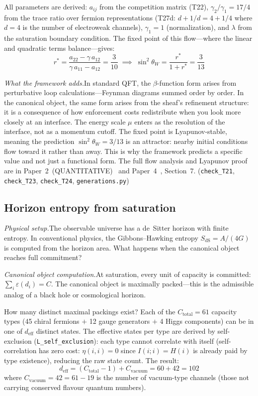 \documentclass[11pt]{article}
\begin{document}
All parameters are derived: $a_{ij}$ from the competition matrix (T22), $\gamma_2/\gamma_1 = 17/4$ from the trace ratio over fermion representations (T27d: $d + 1/d = 4 + 1/4$ where $d=4$ is the number of electroweak channels), $\gamma_1 = 1$ (normalization), and $\lambda$ from the saturation boundary condition.  The fixed point of this flow---where the linear and quadratic terms balance---gives:
\begin{equation}
r^* = \frac{a_{22} - \gamma\, a_{12}}{\gamma\, a_{11} - a_{12}} = \frac{3}{10} \;\implies\; \sin^2\!\theta_W = \frac{r^*}{1 + r^*} = \frac{3}{13}
\end{equation}

\textit{What the framework adds.}\quad In standard QFT, the $\beta$-function form arises from perturbative loop calculations---Feynman diagrams summed order by order.  In the canonical object, the same form arises from the sheaf's refinement structure: it is a consequence of how enforcement costs redistribute when you look more closely at an interface.  The energy scale $\mu$ enters as the resolution of the interface, not as a momentum cutoff.  The fixed point is Lyapunov-stable, meaning the prediction $\sin^2\!\theta_W = 3/13$ is an attractor: nearby initial conditions flow toward it rather than away.  This is why the framework predicts a specific value and not just a functional form.  The full flow analysis and Lyapunov proof are in Paper~2~(QUANTITATIVE)~\cite{P2Q} and Paper~4~\cite{P4}, Section~7.  (\texttt{check\_T21}, \texttt{check\_T23}, \texttt{check\_T24}, \texttt{generations.py})


\subsection{Horizon entropy from saturation}

\textit{Physical setup.}\quad The observable universe has a de~Sitter horizon with finite entropy.  In conventional physics, the Gibbons--Hawking entropy $S_{\mathrm{dS}} = A/(4G)$ is computed from the horizon area.  What happens when the canonical object reaches full commitment?

\textit{Canonical object computation.}\quad At saturation, every unit of capacity is committed: $\sum_i \varepsilon(d_i) = C$.  The canonical object is maximally packed---this is the admissible analog of a black hole or cosmological horizon.

How many distinct maximal packings exist?  Each of the $C_{\mathrm{total}} = 61$ capacity types (45 chiral fermions $+$ 12 gauge generators $+$ 4 Higgs components) can be in one of $d_{\mathrm{eff}}$ distinct states.  The effective states per type are derived by self-exclusion (\texttt{L\_self\_exclusion}): each type cannot correlate with itself (self-correlation has zero cost: $\eta(i,i) = 0$ since $I(i;i) = H(i)$ is already paid by type existence), reducing the raw state count.  The result:
\begin{equation}
d_{\mathrm{eff}} = (C_{\mathrm{total}} - 1) + C_{\mathrm{vacuum}} = 60 + 42 = 102
\end{equation}
where $C_{\mathrm{vacuum}} = 42 = 61 - 19$ is the number of vacuum-type channels (those not carrying conserved flavour quantum numbers).
\end{document}
